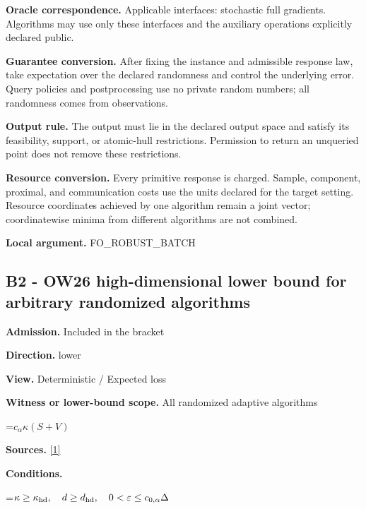 \documentclass[10pt,a4paper]{article}
\newcommand{\AtlasMath}[1]{\par\begingroup\centering\setbox0=\hbox{$\displaystyle #1$}\ifdim\wd0>1.4\linewidth\typeout{ATLAS WIDE FORMULA: \the\wd0}\fi\ifdim\wd0>\linewidth\resizebox{\linewidth}{!}{\box0}\else\box0\fi\par\endgroup}
\begin{document}
\textbf{Oracle correspondence.} Applicable interfaces: stochastic full gradients. Algorithms may use only these interfaces and the auxiliary operations explicitly declared public.



\textbf{Guarantee conversion.} After fixing the instance and admissible response law, take expectation over the declared randomness and control the underlying error. Query policies and postprocessing use no private random numbers; all randomness comes from observations.



\textbf{Output rule.} The output must lie in the declared output space and satisfy its feasibility, support, or atomic-hull restrictions. Permission to return an unqueried point does not remove these restrictions.



\textbf{Resource conversion.} Every primitive response is charged. Sample, component, proximal, and communication costs use the units declared for the target setting. Resource coordinates achieved by one algorithm remain a joint vector; coordinatewise minima from different algorithms are not combined.



\textbf{Local argument.} FO\_ROBUST\_BATCH



\subsection{B2 - OW26 high-dimensional lower bound for arbitrary randomized algorithms}


\textbf{Admission.} Included in the bracket



\textbf{Direction.} lower



\textbf{View.} Deterministic / Expected loss



\textbf{Witness or lower-bound scope.} All randomized adaptive algorithms



\AtlasMath{c_\alpha\kappa(S+V)}


\textbf{Sources.} \href{https://arxiv.org/pdf/2609.03990}{[1]}



\textbf{Conditions.}
\AtlasMath{\kappa\ge\kappa_{\rm hd},\quad d\ge d_{\rm hd},\quad0<\varepsilon\le c_{0,\alpha}\Delta}
\end{document}
